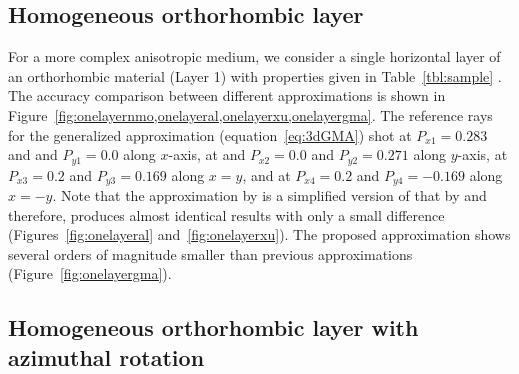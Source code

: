 
\subsection{Homogeneous orthorhombic layer}


For a more complex anisotropic medium, we consider a single horizontal layer of an orthorhombic material (Layer 1) with properties given in Table~\ref{tbl:sample} . The accuracy comparison between different approximations is shown in Figure~\ref{fig:onelayernmo,onelayeral,onelayerxu,onelayergma}. The reference rays for the generalized approximation (equation~\ref{eq:3dGMA})  shot at $P_{x1} = 0.283$ and and $P_{y1}=0.0$ along $x$-axis, at and $P_{x2}=0.0$ and $P_{y2} = 0.271$ along $y$-axis, at $P_{x3}=0.2$ and $P_{y3}=0.169$ along $x=y$, and at $P_{x4}=0.2$ and $P_{y4}=-0.169$ along $x=-y$. Note that the approximation by \cite{xu} is a simplified version of that by \cite{alortho} and therefore, produces almost identical results with only a small difference (Figures~\ref{fig:onelayeral} and~\ref{fig:onelayerxu}). The proposed approximation shows  several orders of magnitude smaller than  previous approximations (Figure~\ref{fig:onelayergma}).

\subsection{Homogeneous orthorhombic layer with azimuthal rotation}


